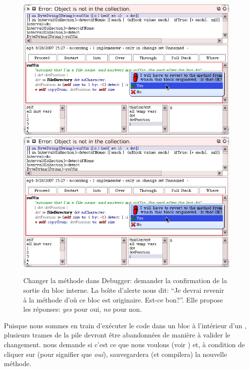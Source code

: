 \documentclass[a4paper,10pt,twoside]{book}
\begin{document}
\begin{figure}[btp]
	\begin{center}
	\ifluluelse
		{\includegraphics[width=\textwidth]{revertDialog}}
		{\includegraphics[scale=0.7]{revertDialog}}
	\end{center}
	\caption{Changer la m\'ethode  dans Debugger: demander la confirmation de la sortie du bloc interne. La bo\^{\i}te d'alerte nous dit: ``Je devrai revenir \`a la m\'ethode d'o\`u ce bloc est originaire. Est-ce bon?''. Elle propose les r\'eponses: \emph{yes} pour oui, \emph{no} pour non.}
	\label{fig:revertDialog}
\end{figure}

Puisque nous sommes en train d'ex\'ecuter le code dans un bloc \`a l'int\'erieur d'un , plusieurs trames de la pile 
devront \^etre abandonn\'ees de mani\`ere \`a valider le changement.
\sq nous demande si c'est ce que nous voulons (voir )
et, \`a condition de cliquer sur  (pour signifier que \emph{oui}), \sq sauvegardera
(et compilera) la nouvelle m\'ethode.
\end{document}
